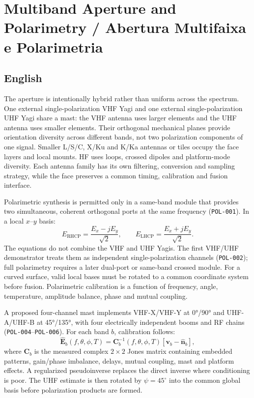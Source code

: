 \chapter{Multiband Aperture and Polarimetry / Abertura Multifaixa e Polarimetria}

\section*{English}
The aperture is intentionally hybrid rather than uniform across the spectrum. One external single-polarization VHF Yagi and one external single-polarization UHF Yagi share a mast: the VHF antenna uses larger elements and the UHF antenna uses smaller elements. Their orthogonal mechanical planes provide orientation diversity across different bands, not two polarization components of one signal. Smaller L/S/C, X/Ku and K/Ka antennas or tiles occupy the face layers and local mounts. HF uses loops, crossed dipoles and platform-mode diversity. Each antenna family has its own filtering, conversion and sampling strategy, while the face preserves a common timing, calibration and fusion interface.

Polarimetric synthesis is permitted only in a same-band module that provides two simultaneous, coherent orthogonal ports at the same frequency (\texttt{POL-001}). In a local $x$--$y$ basis:
\[
E_{\mathrm{RHCP}}=\frac{E_x-jE_y}{\sqrt{2}},\qquad E_{\mathrm{LHCP}}=\frac{E_x+jE_y}{\sqrt{2}}.
\]
The equations do not combine the VHF and UHF Yagis. The first VHF/UHF demonstrator treats them as independent single-polarization channels (\texttt{POL-002}); full polarimetry requires a later dual-port or same-band crossed module. For a curved surface, valid local bases must be rotated to a common coordinate system before fusion. Polarimetric calibration is a function of frequency, angle, temperature, amplitude balance, phase and mutual coupling.

A proposed four-channel mast implements VHF-X/VHF-Y at 0°/90° and UHF-A/UHF-B at 45°/135°, with four electrically independent booms and RF chains (\texttt{POL-004}--\texttt{POL-006}). For each band $b$, calibration follows:
\[
\widehat{\mathbf{E}}_b(f,\theta,\phi,T)=
\mathbf{C}_b^{-1}(f,\theta,\phi,T)
\left[\mathbf{v}_b-\widehat{\mathbf{n}}_b\right],
\]
where $\mathbf{C}_b$ is the measured complex $2\times2$ Jones matrix containing embedded patterns, gain/phase imbalance, delays, mutual coupling, mast and platform effects. A regularized pseudoinverse replaces the direct inverse where conditioning is poor. The UHF estimate is then rotated by $\psi=45^\circ$ into the common global basis before polarization products are formed.

